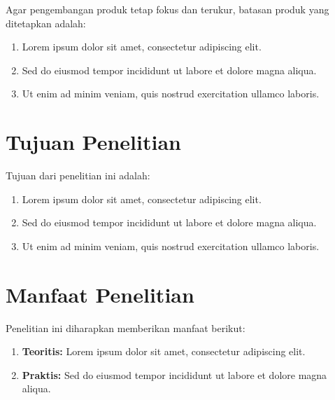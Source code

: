 
Agar pengembangan produk tetap fokus dan terukur, batasan produk yang ditetapkan adalah:

\begin{enumerate}
  \item Lorem ipsum dolor sit amet, consectetur adipiscing elit.
  \item Sed do eiusmod tempor incididunt ut labore et dolore magna aliqua.
  \item Ut enim ad minim veniam, quis nostrud exercitation ullamco laboris.
\end{enumerate}

\section{Tujuan Penelitian}


Tujuan dari penelitian ini adalah:

\begin{enumerate}
  \item Lorem ipsum dolor sit amet, consectetur adipiscing elit.
  \item Sed do eiusmod tempor incididunt ut labore et dolore magna aliqua.
  \item Ut enim ad minim veniam, quis nostrud exercitation ullamco laboris.
\end{enumerate}

\section{Manfaat Penelitian}


Penelitian ini diharapkan memberikan manfaat berikut:

\begin{enumerate}
  \item \textbf{Teoritis:} Lorem ipsum dolor sit amet, consectetur adipiscing elit.
  \item \textbf{Praktis:} Sed do eiusmod tempor incididunt ut labore et dolore magna aliqua.
\end{enumerate}
